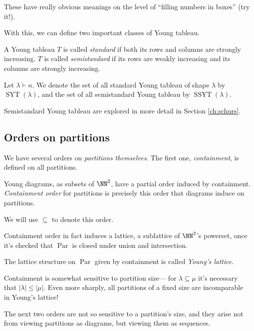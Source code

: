 \documentclass{article}
\DeclareMathOperator{\Par}{Par}
\DeclareMathOperator{\SYT}{SYT}
\DeclareMathOperator{\SSYT}{SSYT}
\begin{document}
These have really obvious meanings on the level of ``filling numbers in boxes'' (try it!).

With this, we can define two important classes of Young tableau.

\begin{definition}
    A Young tableau $T$ is called \textit{standard} if both its rows and columns are strongly increasing. $T$ is called \textit{semistandard} if its rows are weakly increasing and its columns are strongly increasing.

    Let $\lambda \vdash n$. We denote the set of all standard Young tableau of shape $\lambda$ by $\SYT(\lambda)$, and the set of all semistandard Young tableau by $\SSYT(\lambda)$.
\end{definition}

Semistandard Young tableau are explored in more detail in Section \ref{ch:schurs}.

\subsection{Orders on partitions}

We have several orders on \textit{partitions themselves}.
The first one, \textit{containment}, is defined on all partitions.

\begin{definition}
    Young diagrams, as subsets of $\NN^2$, have a partial order induced by containment. 
    \textit{Containment order} for partitions is precisely this order that diagrams induce on partitions.

    We will use $\subseteq$ to denote this order.
\end{definition}

Containment order in fact induces a lattice, a sublattice of $\NN^2$'s powerset, once it's checked that $\Par$ is closed under union and intersection. 

\begin{definition}
    The lattice structure on $\Par$ given by containment is called \textit{Young's lattice}.
\end{definition}

Containment is somewhat sensitive to partition size--- for $\lambda \subseteq \mu$ it's necessary that $|\lambda| \leq |\mu|$.
Even more sharply, all partitions of a fixed size are incomparable in Young's lattice!

The next two orders are not so sensitive to a partition's size, and they arise not from viewing partitions as diagrams, but viewing them as sequences.
\end{document}
